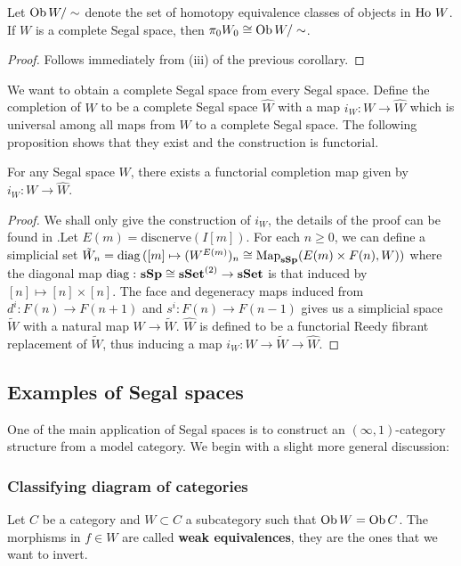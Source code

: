 \begin{refsection}
\begin{cor}
Let $\operatorname{Ob} W/\sim$ denote the set of homotopy equivalence classes of objects in $\operatorname{\mathrm{Ho} \,} W$. If $W$ is a complete Segal space, then $\pi_0W_0\cong\operatorname{Ob} W/\sim$.
\end{cor}
\begin{proof}
Follows immediately from (iii) of the previous corollary.
\end{proof}

We want to obtain a complete Segal space from every Segal space. Define the completion of $W$ to be a complete Segal space $\hat W$ with a map $i_W:W\to\hat W$ which is universal among all maps from $W$ to a complete Segal space. The following proposition shows that they exist and the construction is functorial.

\begin{prop}
For any Segal space $W$, there exists a functorial completion map given by $i_W:W\to\hat W$.
\end{prop}
\begin{proof}
We shall only give the construction of $i_W$, the details of the proof can be found in \cite[Sec.~14]{rezk-a-model-for-the-homotopy-theory-of-homotopy-theories}.Let $E(m)=\mathrm{discnerve}(I[m])$. For each $n \ge 0$, we can define a simplicial set $\tilde W_n=\operatorname{\mathrm{diag} \,}([m]\mapsto (W^{E(m)})_n \cong \operatorname{\mathrm{Map}}_{\mathbf{sSp}}(E(m)\times F(n),W))$ where the diagonal map $\operatorname{\mathrm{diag} \,} \colon \mathbf{sSp}\cong\mathbf{sSet}^{(2)}\to\mathbf{sSet}$ is that induced by $[n]\mapsto[n]\times[n]$. The face and degeneracy maps induced from $d^i \colon F(n)\to F(n+1)$ and $s^i \colon F(n)\to F(n-1)$ gives us a simplicial space $\tilde W$ with a natural map $W\to \tilde W$. $\hat W$ is defined to be a functorial Reedy fibrant replacement of $\tilde W$, thus inducing a map $i_W:W\to\tilde W\to\hat W$.
\end{proof}

\subsection{Examples of Segal spaces}\label{egss}
One of the main application of Segal spaces is to construct an $(\infty,1)$-category structure from a model category. We begin with a slight more general discussion:
\subsubsection{Classifying diagram of categories}
Let $C$ be a category and $W\subset C$ a subcategory such that $\operatorname{Ob} W=\operatorname{Ob} C$. The morphisms in $f\in W$ are called \textbf{weak equivalences}, they are the ones that we want to invert.


\end{refsection}
